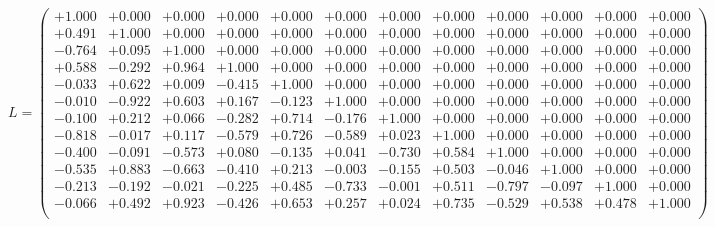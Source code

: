 \documentclass[9pt]{article}
\theoremstyle{plain}
\theoremstyle{definition}
\theoremstyle{remark}
\numberwithin{equation}{section}
\begin{document}
$L = \left(
\begin{array}{
cccccccccccc}
+1.000 & +0.000 & +0.000 & +0.000 & +0.000 & +0.000 & +0.000 & +0.000 & +0.000 & +0.000 & +0.000 & +0.000 \\
+0.491 & +1.000 & +0.000 & +0.000 & +0.000 & +0.000 & +0.000 & +0.000 & +0.000 & +0.000 & +0.000 & +0.000 \\
-0.764 & +0.095 & +1.000 & +0.000 & +0.000 & +0.000 & +0.000 & +0.000 & +0.000 & +0.000 & +0.000 & +0.000 \\
+0.588 & -0.292 & +0.964 & +1.000 & +0.000 & +0.000 & +0.000 & +0.000 & +0.000 & +0.000 & +0.000 & +0.000 \\
-0.033 & +0.622 & +0.009 & -0.415 & +1.000 & +0.000 & +0.000 & +0.000 & +0.000 & +0.000 & +0.000 & +0.000 \\
-0.010 & -0.922 & +0.603 & +0.167 & -0.123 & +1.000 & +0.000 & +0.000 & +0.000 & +0.000 & +0.000 & +0.000 \\
-0.100 & +0.212 & +0.066 & -0.282 & +0.714 & -0.176 & +1.000 & +0.000 & +0.000 & +0.000 & +0.000 & +0.000 \\
-0.818 & -0.017 & +0.117 & -0.579 & +0.726 & -0.589 & +0.023 & +1.000 & +0.000 & +0.000 & +0.000 & +0.000 \\
-0.400 & -0.091 & -0.573 & +0.080 & -0.135 & +0.041 & -0.730 & +0.584 & +1.000 & +0.000 & +0.000 & +0.000 \\
-0.535 & +0.883 & -0.663 & -0.410 & +0.213 & -0.003 & -0.155 & +0.503 & -0.046 & +1.000 & +0.000 & +0.000 \\
-0.213 & -0.192 & -0.021 & -0.225 & +0.485 & -0.733 & -0.001 & +0.511 & -0.797 & -0.097 & +1.000 & +0.000 \\
-0.066 & +0.492 & +0.923 & -0.426 & +0.653 & +0.257 & +0.024 & +0.735 & -0.529 & +0.538 & +0.478 & +1.000 \\
\end{array}
\right)$ \newline 
\end{document}
